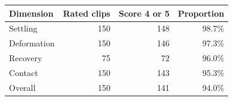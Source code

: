 \begin{tabular}{lrrr}
\toprule
Dimension & Rated clips & Score 4 or 5 & Proportion \\
\midrule
Settling & 150 & 148 & 98.7\% \\
Deformation & 150 & 146 & 97.3\% \\
Recovery & 75 & 72 & 96.0\% \\
Contact & 150 & 143 & 95.3\% \\
Overall & 150 & 141 & 94.0\% \\
\bottomrule
\end{tabular}
